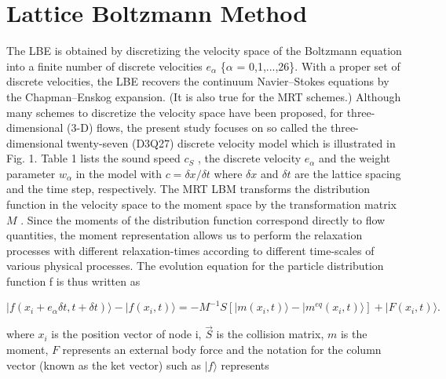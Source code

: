 \section{Lattice Boltzmann Method}
\label{sec:2}

The LBE is obtained by discretizing the velocity space of the Boltzmann equation into a finite number of discrete velocities $e_\alpha$ \{$\alpha$ = 0,1,...,26\}. With a proper set of discrete velocities, the LBE recovers the continuum Navier–Stokes equations by the Chapman–Enskog expansion. (It is also true for the MRT schemes.) Although many schemes to discretize the velocity space have been proposed, for three-dimensional (3-D) flows, the present study focuses on so called the three- dimensional twenty-seven (D3Q27) discrete velocity model which is illustrated in Fig. 1. Table 1 lists the sound speed $c_S$ , the discrete velocity $e_\alpha$ and the weight parameter $w_\alpha$ in the model with $c = \delta x / \delta t$ where $\delta x$ and $\delta t$ are the lattice spacing and the time step, respectively. The MRT LBM transforms the distribution function in the velocity space to the moment space by the transformation matrix $M$ . Since the moments of the distribution function correspond directly to flow quantities, the moment representation allows us to perform the relaxation processes with different relaxation-times according to different time-scales of various physical processes. The evolution equation for the particle distribution function f is thus written as

\begin{equation}
	|f (x_i +e_\alpha \delta t,t+ \delta t)\rangle-|f (x_i,t)\rangle=-M^{-1} S [|m(x_i,t)\rangle - |m^{eq} (x_i,t)\rangle]+|F(x_i,t)\rangle.
\end{equation}

where $x_i$ is the position vector of node i, $\vec{S}$ is the collision matrix, $m$ is the moment, $F$ represents an external body force and the notation for the column vector (known as the ket vector) such as $|f \rangle$ represents

